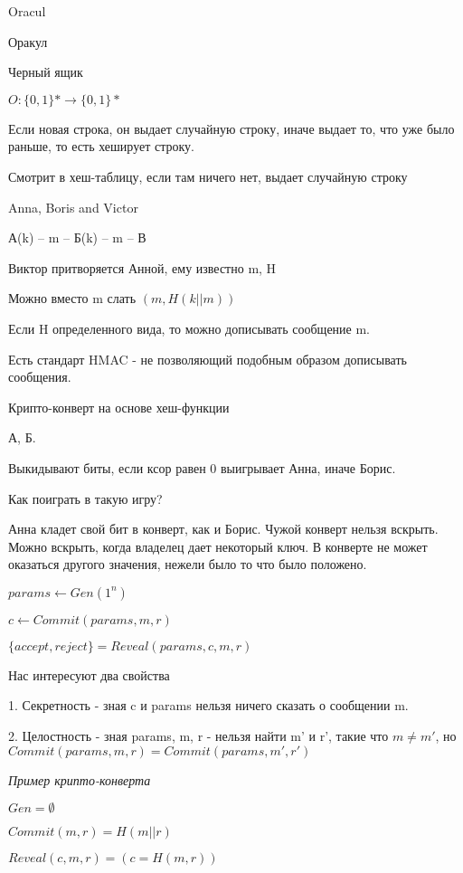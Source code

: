 
\begin{para}{Oracul}

\begin{defe}{Оракул}

Черный ящик

$O : \{0, 1\}* \rightarrow \{0, 1\}*$

Если новая строка, он выдает случайную строку, иначе выдает то, что уже было раньше, то есть хеширует строку.

Смотрит в хеш-таблицу, если там ничего нет, выдает случайную строку

\end{defe}

\end{para}



\begin{para}{Anna, Boris and Victor}

А(k) -- m -- Б(k) -- m -- В

Виктор притворяется Анной, ему известно m, H

Можно вместо m слать $(m, H(k || m))$

Если H определенного вида, то можно дописывать сообщение m.

Есть стандарт HMAC - не позволяющий подобным образом дописывать сообщения.

\end{para}



\begin{para}{Крипто-конверт на основе хеш-функции}

А, Б.

Выкидывают биты, если ксор равен 0 выигрывает Анна, иначе Борис.

Как поиграть в такую игру?

Анна кладет свой бит в конверт, как и Борис. Чужой конверт нельзя вскрыть. Можно вскрыть, когда владелец дает некоторый ключ. В конверте не может 
оказаться другого значения, нежели было то что было положено.

$params \leftarrow Gen(1^n)$

$c \leftarrow Commit(params, m, r)$

$\{accept, reject\} = Reveal(params, c, m, r)$

Нас интересуют два свойства

1. Секретность - зная c и params нельзя ничего сказать о сообщении m.

2. Целостность - зная params, m, r - нельзя найти m' и r', такие что $m \neq m'$, но $Commit(params, m, r) = Commit(params, m', r')$

\textit{Пример крипто-конверта}

$Gen = \emptyset$

$Commit(m, r) = H(m || r)$

$Reveal(c, m, r) = (c = H(m, r))$

\end{para}



